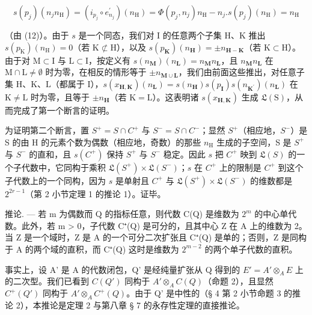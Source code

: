 \[
s \left(p _ {j}\right) \left(n _ {j} n _ {\mathrm{H}}\right) = \left(i _ {p _ {j}} \circ e _ {n _ {j}} ^ {\prime}\right) \left(n _ {\mathrm{H}}\right) = \Phi \left(p _ {j}, n _ {j}\right) n _ {\mathrm{H}} - n _ {j}. s \left(p _ {j}\right) \left(n _ {\mathrm{H}}\right) = n _ {\mathrm{H}}
\]

（由 (12)）。由于 \(s\) 是一个同态，我们对 I 的任意两个子集 H、K 推出 \(s(p_{\mathrm{K}})(n_{\mathrm{H}}) = 0\)（若 \(\mathrm{K} \not\subset \mathrm{H}\)），以及 \(s(p_{\mathbf{K}}) (n_{\mathbf{H}}) = \pm n_{\mathbf{H} - \mathbf{K}}\)（若 \(\mathrm{K} \subset \mathrm{H}\)）。由于对 \(\mathrm{M} \subset \mathrm{I}\) 与 \(\mathrm{L} \subset \mathrm{I}\)，按定义有 \(s(n_{\mathbf{M}})(n_{\mathbf{L}}) = n_{\mathbf{M}}n_{\mathbf{L}}\)，且 \(n_{\mathbf{M}}n_{\mathbf{L}}\) 在 \(\mathrm{M} \cap \mathrm{L} \neq \emptyset\) 时为零，在相反的情形等于 \(\pm n_{\mathbf{M} \cup \mathbf{L}}\)，我们由前面这些推出，对任意子集 \(\mathrm{H}\)、\(\mathrm{K}\)、\(\mathrm{L}\)（都属于 \(\mathrm{I}\)），\(s(x_{\mathbf{H},\mathbf{K}})(n_{\mathbf{L}}) = s(n_{\mathbf{H}})s(p_{\mathbf{I}})s(n_{\mathbf{K}^{\prime}})(n_{\mathbf{L}})\) 在 \(\mathrm{K} \neq \mathrm{L}\) 时为零，且等于 \(\pm n_{\mathbf{H}}\)（若 \(\mathrm{K} = \mathrm{L}\)）。这表明诸 \(s(x_{\mathbf{H},\mathbf{K}})\) 生成 \(\mathfrak{L}(\mathrm{S})\)，从而完成了第一个断言的证明。

  为证明第二个断言，置 \(S^{+} = S \cap C^{+}\) 与 \(S^{-} = S \cap C^{-}\)；显然 \(S^{+}\)（相应地，\(S^{-}\)）是 S 的由 H 的元素个数为偶数（相应地，奇数）的那些 \(n_{\mathrm{H}}\) 生成的子空间，S 是 \(S^{+}\) 与 \(S^{-}\) 的直和，且 \(s(C^{+})\) 保持 \(S^{+}\) 与 \(S^{-}\) 稳定。因此 \(s\) 把 \(C^{+}\) 映到 \(\mathfrak{L}(S)\) 的一个子代数中，它同构于乘积 \(\mathfrak{L}(S^{+}) \times \mathfrak{L}(S^{-})\)；\(s\) 在 \(C^{+}\) 上的限制是 \(C^{+}\) 到这个子代数上的一个同构，因为 \(s\) 是单射且 \(C^{+}\) 与 \(\mathfrak{L}(S^{+}) \times \mathfrak{L}(S^{-})\) 的维数都是 \(2^{2r-1}\)（第 2 小节定理 1 的推论 1）。证毕。

推论. --- 若 m 为偶数而 Q 的指标任意，则代数 C(Q) 是维数为 \(2^{m}\) 的中心单代数。此外，若 m \textgreater{} 0，子代数 C⁺(Q) 是可分的，且其中心 Z 在 A 上的维数为 2。当 Z 是一个域时，Z 是 A 的一个可分二次扩张且 C⁺(Q) 是单的；否则，Z 是同构于 A 的两个域的直积，而 C⁺(Q) 这时是维数为 \(2^{m-2}\) 的两个单子代数的直积。

  事实上，设 A' 是 A 的代数闭包，Q' 是经纯量扩张从 Q 得到的 \(E' = A' \otimes_{A} E\) 上的二次型。我们已看到 \(C(Q')\) 同构于 \(A' \otimes_{A} C(Q)\)（命题 2），且显然 \(C^{+}(Q')\) 同构于 \(A' \otimes_{A} C^{+}(Q)\)。由于 Q' 是中性的（§ 4 第 2 小节命题 3 的推论 2），本推论是定理 2 与第八章 § 7 的永存性定理的直接推论。


